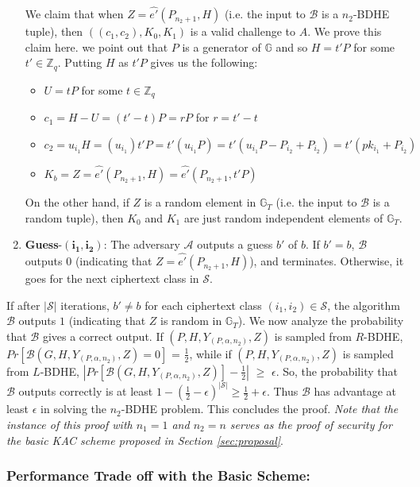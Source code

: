 \begin{enumerate}
 We claim that when $Z=\hat{e'}(P_{n_2+1},H)$ (i.e. the input to $\mathcal{B}$ is a $n_2$-BDHE tuple), then $((c_1,c_2),K_0,K_1)$ is a valid challenge to $A$. We prove this claim here. we point out that $P$ is a generator of $\mathbb{G}$ and so $H=t'P$ for some $t'\in\mathbb{Z}_q$. Putting $H$ as $t'P$ gives us the following:
 \begin{itemize}
  \item  $U=tP$ for some $t\in\mathbb{Z}_q$
  \item $c_1=H-U=(t'-t)P=rP$ for $r=t'-t$
  \item $c_2=u_{i_1}H=(u_{i_1})t'P=t'(u_{i_1}P)=t'(u_{i_1}P-P_{i_2}+P_{i_2})=t'(pk_{i_1}+P_{i_2})$
  \item $K_b=Z=\hat{e'}(P_{n_2+1},H)=\hat{e'}(P_{n_2+1},t'P)$
 \end{itemize}
 On the other hand, if $Z$ is a random element in $\mathbb{G}_T$ (i.e. the input to $\mathcal{B}$ is a random tuple), then $K_0$ and $K_1$ are just random independent elements of $\mathbb{G}_T$.
 
 \item\textbf{Guess}-$\mathbf{(i_1,i_2)}$: The adversary $\mathcal{A}$ outputs a guess $b'$ of $b$. If $b' = b$, $\mathcal{B}$ outputs $0$ (indicating that $Z = \hat{e'}(P_{n_2+1},H)$), and terminates. Otherwise, it goes for the next ciphertext class in $\mathcal{S}$.
\end{enumerate}
If after $|\mathcal{S}|$ iterations, $b' \neq b$ for each ciphertext class $(i_1,i_2)\in\mathcal{S}$, the algorithm $\mathcal{B}$ outputs $1$ (indicating that $Z$ is random in $\mathbb{G}_T$). We now analyze the probability that $\mathcal{B}$ gives a correct output. If $(P,H,Y_{(P,\alpha,n_2)},Z)$ is sampled from $R$-BDHE, $Pr[\mathcal{B}(G,H,Y_{(P,\alpha,n_2)},Z)=0]$ = $\frac{1}{2}$, while if $(P,H,Y_{(P,\alpha,n_2)},Z)$ is sampled from $L$-BDHE, $|Pr[\mathcal{B}(G,H,Y_{(P,\alpha,n_2)},Z)]-\frac{1}{2}|$ $\geq$ $\epsilon$. So, the probability that $\mathcal{B}$ outputs correctly is at least $1-(\frac{1}{2}-\epsilon)^{|\mathcal{S}|} \geq \frac{1}{2}+\epsilon$. Thus $\mathcal{B}$ has advantage at least $\epsilon$ in solving the $n_2$-BDHE problem. This concludes the proof. \emph{Note that the instance of this proof with $n_1=1$ and $n_2=n$ serves as the proof of security for the basic KAC scheme proposed in Section \ref{sec:proposal}}.


\subsubsection{Performance Trade off with the Basic Scheme:} 

